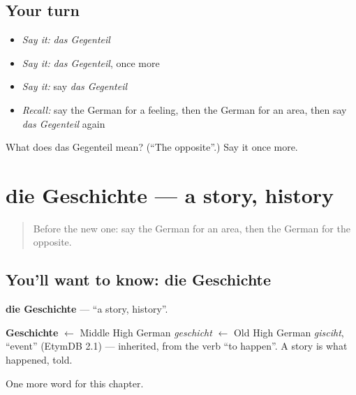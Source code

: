\subsection*{Your turn}
\begin{itemize}
\raggedright
  \item \emph{Say it:} \emph{das Gegenteil}
  \item \emph{Say it:} \emph{das Gegenteil}, once more
  \item \emph{Say it:} say \emph{das Gegenteil}
  \item \emph{Recall:} say the German for a feeling, then the German for an area, then say \emph{das Gegenteil} again
\end{itemize}

\begin{tcolorbox}[breakable,colback=teal!4,colframe=teal!35!black,title={Before you move on}]
What does das Gegenteil mean? (\textquotedblleft{}The opposite\textquotedblright{}.) Say it once more.
\end{tcolorbox}
\section[die Geschichte]{die Geschichte — a story, history}

\label{lesson:GE-C230-geschichte}



\begin{quote}
Before the new one: say the German for an area, then the German for the opposite.
\end{quote}

\subsection*{You'll want to know: die Geschichte}
\textbf{die Geschichte} — \textquotedblleft{}a story, history\textquotedblright{}.

\begin{cousinweb}
\textbf{Geschichte} $\leftarrow$ Middle High German \emph{geschicht} $\leftarrow$ Old High German \emph{gisciht}, \textquotedblleft{}event\textquotedblright{} (EtymDB 2.1) — inherited, from the verb \textquotedblleft{}to happen\textquotedblright{}. A story is what happened, told.
\end{cousinweb}

\begin{grammarlens}[title={What you've built}]
One more word for this chapter.
\end{grammarlens}

